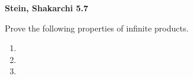 \textbf{Stein, Shakarchi 5.7}

Prove the following properties of infinite products.

\begin{enumerate}
  \item 
  \pagebreak
  \item 
  \pagebreak
  \item 
\end{enumerate}
